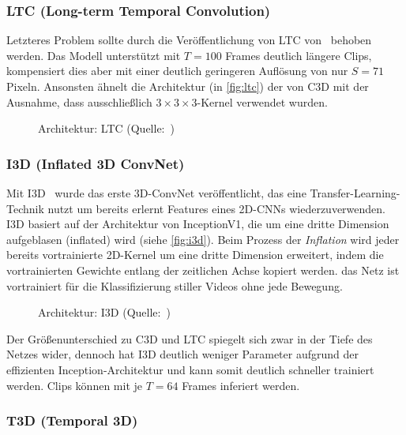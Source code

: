 \subsubsection*{LTC (Long-term Temporal Convolution)}

Letzteres Problem sollte durch die Veröffentlichung von LTC von~\cite{Varol18} behoben werden.
Das Modell unterstützt mit $T=100$ Frames deutlich längere Clips, kompensiert dies aber mit einer deutlich geringeren Auflösung von nur $S=71$ Pixeln.
Ansonsten ähnelt die Architektur (in \autoref{fig:ltc}) der von C3D mit der Ausnahme, dass ausschließlich $3 \times 3 \times 3$-Kernel verwendet wurden.

\begin{figure}[h!]
    \centering
    \caption{Architektur: LTC (Quelle:~\cite{Varol18})}
    \label{fig:ltc}
\end{figure}

\subsubsection*{I3D (Inflated 3D ConvNet)}

Mit I3D~\cite{Carreira17} wurde das erste 3D-ConvNet veröffentlicht, das eine Transfer-Learning-Technik nutzt um bereits erlernt Features eines 2D-CNNs wiederzuverwenden.
I3D basiert auf der Architektur von InceptionV1, die um eine dritte Dimension aufgeblasen (inflated) wird (siehe \autoref{fig:i3d}).
Beim Prozess der \emph{Inflation} wird jeder bereits vortrainierte 2D-Kernel um eine dritte Dimension erweitert, indem die vortrainierten Gewichte entlang der zeitlichen Achse kopiert werden.
\Dh das Netz ist vortrainiert für die Klassifizierung stiller Videos ohne jede Bewegung.

\begin{figure}[h!]
    \centering
    \caption{Architektur: I3D (Quelle:~\cite{Carreira17})}
    \label{fig:i3d}
\end{figure}

Der Größenunterschied zu C3D und LTC spiegelt sich zwar in der Tiefe des Netzes wider, dennoch hat I3D deutlich weniger Parameter aufgrund der effizienten Inception-Architektur und kann somit deutlich schneller trainiert werden.
Clips können mit je $T=64$ Frames inferiert werden.

\subsubsection*{T3D (Temporal 3D)}

